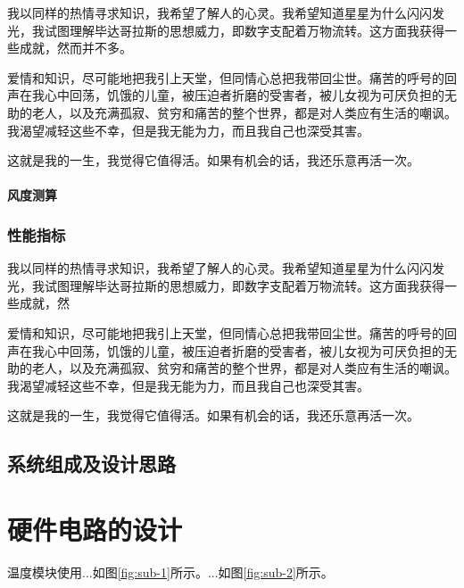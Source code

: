 \documentclass{thxythesis}
\begin{document}
我以同样的热情寻求知识，我希望了解人的心灵。我希望知道星星为什么闪闪发光，我试图理解毕达哥拉斯的思想威力，即数字支配着万物流转。这方面我获得一些成就，然而并不多。

爱情和知识，尽可能地把我引上天堂，但同情心总把我带回尘世。痛苦的呼号的回声在我心中回荡，饥饿的儿童，被压迫者折磨的受害者，被儿女视为可厌负担的无助的老人，以及充满孤寂、贫穷和痛苦的整个世界，都是对人类应有生活的嘲讽。我渴望减轻这些不幸，但是我无能为力，而且我自己也深受其害。

这就是我的一生，我觉得它值得活。如果有机会的话，我还乐意再活一次。


\subsubsection{风度测算}


\subsection{性能指标}
我以同样的热情寻求知识，我希望了解人的心灵。我希望知道星星为什么闪闪发光，我试图理解毕达哥拉斯的思想威力，即数字支配着万物流转。这方面我获得一些成就，然

爱情和知识，尽可能地把我引上天堂，但同情心总把我带回尘世。痛苦的呼号的回声在我心中回荡，饥饿的儿童，被压迫者折磨的受害者，被儿女视为可厌负担的无助的老人，以及充满孤寂、贫穷和痛苦的整个世界，都是对人类应有生活的嘲讽。我渴望减轻这些不幸，但是我无能为力，而且我自己也深受其害。

这就是我的一生，我觉得它值得活。如果有机会的话，我还乐意再活一次。


\section{系统组成及设计思路}


\chapter{硬件电路的设计}
温度模块使用...如图\ref{fig:sub-1}所示。...如图\ref{fig:sub-2}所示。
\end{document}
